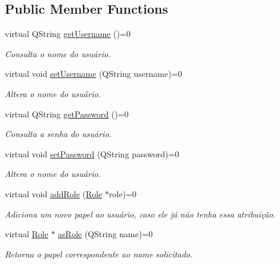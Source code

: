\subsection*{Public Member Functions}
\begin{DoxyCompactItemize}
\item 
virtual Q\+String \hyperlink{classUser_ae468e9100cfb4ab518863393d3d15bbd}{get\+Username} ()=0
\begin{DoxyCompactList}\small\item\em Consulta o nome do usuário. \end{DoxyCompactList}\item 
virtual void \hyperlink{classUser_af026df21b06a8cab417707cbce3a4f8b}{set\+Username} (Q\+String username)=0
\begin{DoxyCompactList}\small\item\em Altera o nome do usuário. \end{DoxyCompactList}\item 
virtual Q\+String \hyperlink{classUser_a552814f109b3892d39e1d43a411bb89e}{get\+Password} ()=0
\begin{DoxyCompactList}\small\item\em Consulta a senha do usuário. \end{DoxyCompactList}\item 
virtual void \hyperlink{classUser_a4bcb0c01280d285d35efe7bfc35c1641}{set\+Password} (Q\+String password)=0
\begin{DoxyCompactList}\small\item\em Altera o nome do usuário. \end{DoxyCompactList}\item 
virtual void \hyperlink{classUser_a0a41c08c3c4a4b5fc778fc3137fd6a8c}{add\+Role} (\hyperlink{classRole}{Role} $\ast$role)=0
\begin{DoxyCompactList}\small\item\em Adiciona um novo papel ao usuário, caso ele já não tenha essa atribuição. \end{DoxyCompactList}\item 
virtual \hyperlink{classRole}{Role} $\ast$ \hyperlink{classUser_a4a67b5285f21c7f33e9efe4326f608e4}{as\+Role} (Q\+String name)=0
\begin{DoxyCompactList}\small\item\em Retorna o papel correspondente ao name solicitado. \end{DoxyCompactList}\end{DoxyCompactItemize}


